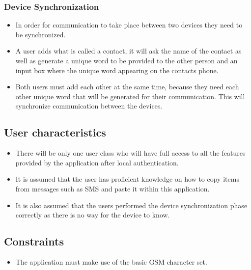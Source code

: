 \subsubsection{Device Synchronization}
\begin{itemize}
\item In order for communication to take place between two devices they need to be synchronized.
\item A user adds what is called a contact, it will ask the name of the contact as well as generate a unique word to be provided to the other person and an input box where the unique word appearing on the contacts phone.
\item Both users must add each other at the same time, because they need each other unique word that will be generated for their communication. This will synchronize communication between the devices.
\end{itemize}

\subsection{User characteristics}
\begin{itemize}
\item There will be only one user class who will have full access to all the features provided by the application after local authentication.
\item It is assumed that the user has proficient knowledge on how to copy items from messages such as SMS and paste it within this application.
\item It is also assumed that the users performed the device synchronization phase correctly as there is no way for the device to know.
\end{itemize}


\subsection{Constraints}
\begin{itemize}
\item The application must make use of the basic GSM character set.
\end{itemize}



